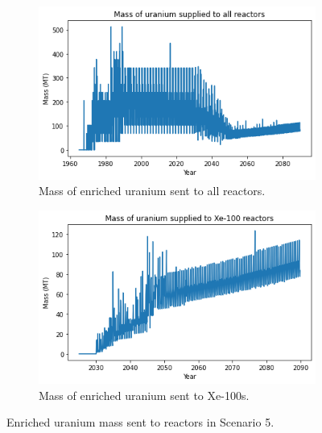 \begin{figure}
    \centering
    \begin{subfigure}{0.45\textwidth}
        \centering
        \includegraphics[scale=0.4]{../figures/fuelsupply_scenarios_5.png}
        \caption{Mass of enriched uranium sent to all reactors.}
        \label{fig:totalfuel_5}
    \end{subfigure}
    \hspace{0.8cm}
    \begin{subfigure}{0.45\textwidth}
        \centering
        \includegraphics[scale=0.4]{../figures/advancedRX_fuelsupply_scenarios_5.png}
        \caption{Mass of enriched uranium sent to Xe-100s.}
        \label{fig:haleu_5}
    \end{subfigure}
    \caption{Enriched uranium mass sent to reactors in Scenario 5.}
    \label{fig:fuel_5}
\end{figure}


